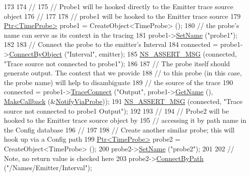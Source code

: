 \begin{DoxyCode}
173 
174   \textcolor{comment}{//}
175   \textcolor{comment}{// Probe1 will be hooked directly to the Emitter trace source object}
176   \textcolor{comment}{//}
177 
178   \textcolor{comment}{// probe1 will be hooked to the Emitter trace source}
179   \hyperlink{classns3_1_1Ptr}{Ptr<TimeProbe>} probe1 = CreateObject<TimeProbe> ();
180   \textcolor{comment}{// the probe's name can serve as its context in the tracing}
181   probe1->\hyperlink{classns3_1_1DataCollectionObject_a9bf5a3af1190f7efadb1baae36889eaa}{SetName} (\textcolor{stringliteral}{"probe1"});
182 
183   \textcolor{comment}{// Connect the probe to the emitter's Interval}
184   connected = probe1->\hyperlink{classns3_1_1TimeProbe_a01778c1013aca0788e98085fc86ab136}{ConnectByObject} (\textcolor{stringliteral}{"Interval"}, emitter);
185   \hyperlink{assert_8h_aff5ece9066c74e681e74999856f08539}{NS\_ASSERT\_MSG} (connected, \textcolor{stringliteral}{"Trace source not connected to probe1"});
186 
187   \textcolor{comment}{// The probe itself should generate output.  The context that we provide}
188   \textcolor{comment}{// to this probe (in this case, the probe name) will help to disambiguate}
189   \textcolor{comment}{// the source of the trace}
190   connected = probe1->\hyperlink{classns3_1_1ObjectBase_ada3a45b34bc23114a25e0ab19188276e}{TraceConnect} (\textcolor{stringliteral}{"Output"}, probe1->\hyperlink{classns3_1_1DataCollectionObject_a2e37eac50a8ff0b7d3030ed82132afdd}{GetName} (), 
      \hyperlink{group__makecallbackmemptr_ga9376283685aa99d204048d6a4b7610a4}{MakeCallback} (&\hyperlink{time-probe-example_8cc_a2b89eb6cf8dc830f27ce00766bf62c68}{NotifyViaProbe}));
191   \hyperlink{assert_8h_aff5ece9066c74e681e74999856f08539}{NS\_ASSERT\_MSG} (connected, \textcolor{stringliteral}{"Trace source not connected to probe1 Output"});
192 
193   \textcolor{comment}{//}
194   \textcolor{comment}{// Probe2 will be hooked to the Emitter trace source object by}
195   \textcolor{comment}{// accessing it by path name in the Config database}
196   \textcolor{comment}{//}
197 
198   \textcolor{comment}{// Create another similar probe; this will hook up via a Config path}
199   \hyperlink{classns3_1_1Ptr}{Ptr<TimeProbe>} probe2 = CreateObject<TimeProbe> ();
200   probe2->\hyperlink{classns3_1_1DataCollectionObject_a9bf5a3af1190f7efadb1baae36889eaa}{SetName} (\textcolor{stringliteral}{"probe2"});
201 
202   \textcolor{comment}{// Note, no return value is checked here}
203   probe2->\hyperlink{classns3_1_1TimeProbe_a537eb677001130b775c926e2432ad84e}{ConnectByPath} (\textcolor{stringliteral}{"/Names/Emitter/Interval"});

\end{DoxyCode}
